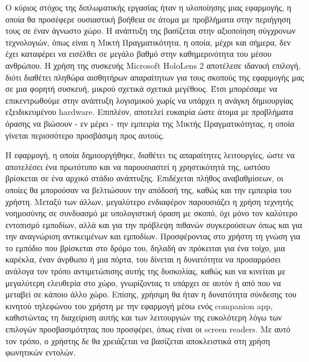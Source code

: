 Ο κύριος στόχος της διπλωματικής εργασίας ήταν η υλοποίησης μιας εφαρμογής, η οποία θα προσέφερε ουσιαστική βοήθεια σε άτομα με προβλήματα	στην περιήγηση τους σε έναν άγνωστο χώρο. Η ανάπτυξη της βασίζεται στην αξιοποίηση σύγχρονων τεχνολογιών, όπως είναι η Μικτή Πραγματικότητα, η οποία, μέχρι και σήμερα, δεν έχει καταφέρει να εισέλθει σε μεγάλο βαθμό στην καθημερινότητα του μέσου ανθρώπου. Η χρήση της συσκευής Microsoft HoloLens 2 αποτέλεσε ιδανική επιλογή, διότι διαθέτει πληθώρα αισθητήρων απαραίτητων για τους σκοπούς της εφαρμογής μας σε μια φορητή συσκευή, μικρού σχετικά σχετικά μεγέθους. Έτσι μπορέσαμε να επικεντρωθούμε στην ανάπτυξη λογισμικού χωρίς να υπάρχει η ανάγκη δημιουργίας εξειδικευμένου hardware. Επιπλέον, αποτελεί ευκαιρία ώστε άτομα με προβλήματα όρασης να βιώσουν - εν μέρει - την εμπειρία της Μικτής Πραγματικότητας, η οποία γίνεται περισσότερο προσβάσιμη προς αυτούς. %

Η εφαρμογή, η οποία δημιουργήθηκε, διαθέτει τις απαραίτητες λειτουργίες, ώστε να αποτελέσει ένα πρωτότυπο και να παρουσιαστεί η χρηστικότητά της, ωστόσο βρίσκεται σε ένα αρχικό στάδιο ανάπτυξης. Επιδέχεται πλήθος αναβαθμίσεων, οι οποίες θα μπορούσαν να βελτιώσουν την απόδοσή της, καθώς και την εμπειρία του χρήστη. Μεταξύ των άλλων, μεγαλύτερο ενδιαφέρον παρουσιάζει η χρήση τεχνητής νοημοσύνης σε συνδυασμό με υπολογιστική όραση με σκοπό, όχι μόνο τον καλύτερο εντοπισμό εμποδίων, αλλά και για την πρόβλεψη πιθανών συγκερούσεων όπως και για την αναγνώριση αντικειμένων και εμποδίων. Προσφέροντας στο χρήστη τη γνώση για το εμπόδιο που βρίσκεται στο δρόμο του, δηλαδή αν πρόκειται για ένα τοίχο, μια καρέκλα, έναν άνρθωπο ή μια πόρτα, του δίνεται η δυνατότητα να προσαρμόσει ανάλογα τον τρόπο αντιμετώπισης αυτής της δυσκολίας, καθώς και να κινείται με μεγαλύτερη ελευθερία στο χώρο, γνωρίζοντας τι υπάρχει σε αυτόν ή από που να μεταβεί σε κάποιο άλλο χώρο. Επίσης, χρήσιμη θα ήταν η δυνατότητα σύνδεσης του κινητού τηλεφώνου του χρήστη με την εφαρμογή μέσω ενός companion app, καθιστώντας τη διαχείριση αυτής και των λειτουργιών της ευκολότερη λόγω των επιλογών προσβασιμότητας που προσφέρει, όπως είναι οι screen readers. 
Με αυτό τον τρόπο, ο χρήστης δε θα χρειάζεται να βασίζεται αποκλειστικά στη χρήση φωνητικών εντολών.
